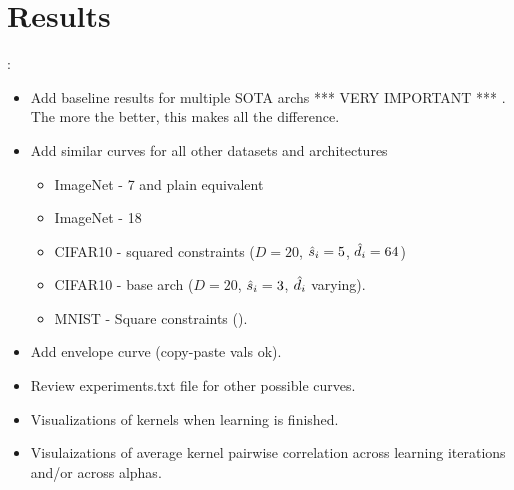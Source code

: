 \section{Results}




   :
\begin{itemize}
\item Add baseline results for multiple SOTA archs *** VERY IMPORTANT *** . The more the better, this makes all the difference.
\item Add similar curves for all other datasets and architectures
  \begin{itemize}
  \item ImageNet - \resnet{} 7 and plain equivalent
  \item ImageNet - \resnet{} 18
  \item CIFAR10 - squared constraints ($D=20$, $\hat{s}_i=5$, $\hat{d}_i=64$) 
  \item CIFAR10 - base arch ($D=20$, $\hat{s}_i=3$, $\hat{d}_i$ varying).
  \item MNIST - Square constraints ().
  \end{itemize}
\item Add envelope curve (copy-paste vals ok).
\end{itemize}


\begin{itemize}
\item Review experiments.txt file for other possible curves.
\item Visualizations of kernels when learning is finished.
\item Visulaizations of average kernel pairwise correlation across learning iterations and/or across alphas.
\end{itemize}



